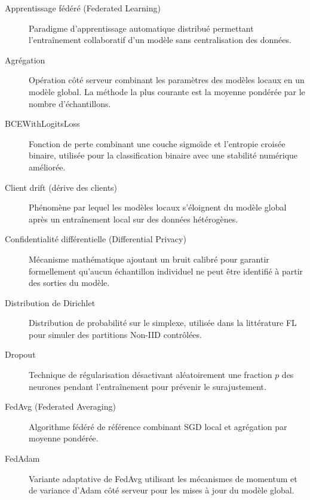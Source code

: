 \documentclass[12pt,a4paper]{report}
\begin{document}
\begin{description}
\item[Apprentissage f\'{e}d\'{e}r\'{e} (Federated Learning)] Paradigme d'apprentissage automatique distribu\'{e} permettant l'entra\^{i}nement collaboratif d'un mod\`{e}le sans centralisation des donn\'{e}es.

\item[Agr\'{e}gation] Op\'{e}ration c\^{o}t\'{e} serveur combinant les param\`{e}tres des mod\`{e}les locaux en un mod\`{e}le global. La m\'{e}thode la plus courante est la moyenne pond\'{e}r\'{e}e par le nombre d'\'{e}chantillons.

\item[BCEWithLogitsLoss] Fonction de perte combinant une couche sigmo\"{\i}de et l'entropie crois\'{e}e binaire, utilis\'{e}e pour la classification binaire avec une stabilit\'{e} num\'{e}rique am\'{e}lior\'{e}e.

\item[Client drift (d\'{e}rive des clients)] Ph\'{e}nom\`{e}ne par lequel les mod\`{e}les locaux s'\'{e}loignent du mod\`{e}le global apr\`{e}s un entra\^{i}nement local sur des donn\'{e}es h\'{e}t\'{e}rog\`{e}nes.

\item[Confidentialit\'{e} diff\'{e}rentielle (Differential Privacy)] M\'{e}canisme math\'{e}matique ajoutant un bruit calibr\'{e} pour garantir formellement qu'aucun \'{e}chantillon individuel ne peut \^{e}tre identifi\'{e} \`{a} partir des sorties du mod\`{e}le.

\item[Distribution de Dirichlet] Distribution de probabilit\'{e} sur le simplexe, utilis\'{e}e dans la litt\'{e}rature FL pour simuler des partitions Non-IID contr\^{o}l\'{e}es.

\item[Dropout] Technique de r\'{e}gularisation d\'{e}sactivant al\'{e}atoirement une fraction $p$ des neurones pendant l'entra\^{i}nement pour pr\'{e}venir le surajustement.

\item[FedAvg (Federated Averaging)] Algorithme f\'{e}d\'{e}r\'{e} de r\'{e}f\'{e}rence combinant SGD local et agr\'{e}gation par moyenne pond\'{e}r\'{e}e.

\item[FedAdam] Variante adaptative de FedAvg utilisant les m\'{e}canismes de momentum et de variance d'Adam c\^{o}t\'{e} serveur pour les mises \`{a} jour du mod\`{e}le global.


\end{description}
\end{document}
